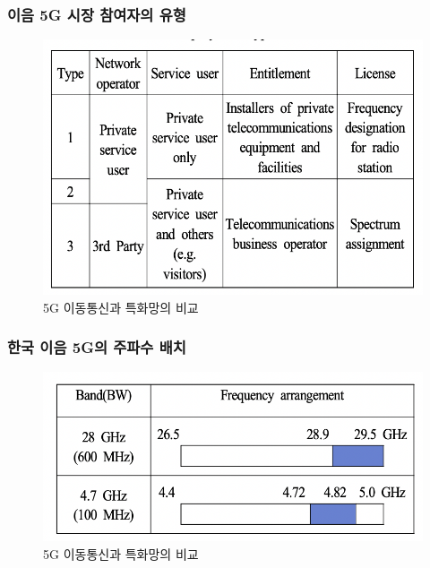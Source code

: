 \subsubsection*{이음 5G 시장 참여자의 유형}
    \begin{figure}[!h]\centering
		\includegraphics[width=.65\textwidth]{image/week03/2-2-1.png}
		\caption{\small 5G 이동통신과 특화망의 비교}
		\vspace{-10pt}
    \end{figure}
\subsubsection*{한국 이음 5G의 주파수 배치}
    \begin{figure}[!h]\centering
		\includegraphics[width=.65\textwidth]{image/week03/2-2-2.png}
		\caption{\small 5G 이동통신과 특화망의 비교}
		\vspace{-10pt}
    \end{figure}
